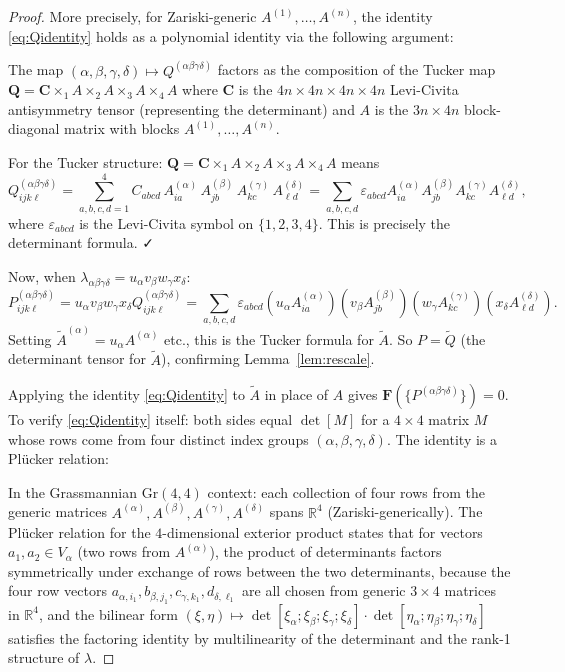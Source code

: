 \documentclass[12pt]{article}
\theoremstyle{definition}
\newcommand{\R}{\mathbb{R}}
\begin{document}
\begin{proof}
More precisely, for Zariski-generic $A^{(1)},\ldots,A^{(n)}$, the identity \eqref{eq:Qidentity} holds as a polynomial identity via the following argument:

The map $(\alpha,\beta,\gamma,\delta) \mapsto Q^{(\alpha\beta\gamma\delta)}$ factors as the composition of the Tucker map $\mathbf{Q} = \mathbf{C} \times_1 A \times_2 A \times_3 A \times_4 A$ where $\mathbf{C}$ is the $4n\times 4n\times 4n\times 4n$ Levi-Civita antisymmetry tensor (representing the determinant) and $A$ is the $3n\times 4n$ block-diagonal matrix with blocks $A^{(1)},\ldots,A^{(n)}$.

For the Tucker structure: $\mathbf{Q} = \mathbf{C} \times_1 A \times_2 A \times_3 A \times_4 A$ means
\[
Q^{(\alpha\beta\gamma\delta)}_{ijk\ell} = \sum_{a,b,c,d=1}^{4}C_{abcd}\,A^{(\alpha)}_{ia}\,A^{(\beta)}_{jb}\,A^{(\gamma)}_{kc}\,A^{(\delta)}_{\ell d}
= \sum_{a,b,c,d}\varepsilon_{abcd}A^{(\alpha)}_{ia}A^{(\beta)}_{jb}A^{(\gamma)}_{kc}A^{(\delta)}_{\ell d},
\]
where $\varepsilon_{abcd}$ is the Levi-Civita symbol on $\{1,2,3,4\}$. This is precisely the determinant formula. ✓

Now, when $\lambda_{\alpha\beta\gamma\delta} = u_\alpha v_\beta w_\gamma x_\delta$:
\[
P^{(\alpha\beta\gamma\delta)}_{ijk\ell} = u_\alpha v_\beta w_\gamma x_\delta Q^{(\alpha\beta\gamma\delta)}_{ijk\ell} = \sum_{a,b,c,d}\varepsilon_{abcd}(u_\alpha A^{(\alpha)}_{ia})(v_\beta A^{(\beta)}_{jb})(w_\gamma A^{(\gamma)}_{kc})(x_\delta A^{(\delta)}_{\ell d}).
\]
Setting $\widetilde{A}^{(\alpha)} = u_\alpha A^{(\alpha)}$ etc., this is the Tucker formula for $\widetilde{A}$. So $P = \widetilde{Q}$ (the determinant tensor for $\widetilde{A}$), confirming Lemma~\ref{lem:rescale}.

Applying the identity \eqref{eq:Qidentity} to $\widetilde{A}$ in place of $A$ gives $\mathbf{F}(\{P^{(\alpha\beta\gamma\delta)}\}) = 0$. To verify \eqref{eq:Qidentity} itself: both sides equal $\det[M]$ for a $4\times 4$ matrix $M$ whose rows come from four distinct index groups $(\alpha,\beta,\gamma,\delta)$. The identity is a Pl\"ucker relation:

In the Grassmannian $\mathrm{Gr}(4,4)$ context: each collection of four rows from the generic matrices $A^{(\alpha)},A^{(\beta)},A^{(\gamma)},A^{(\delta)}$ spans $\R^4$ (Zariski-generically). The Pl\"ucker relation for the $4$-dimensional exterior product states that for vectors $a_1,a_2 \in V_\alpha$ (two rows from $A^{(\alpha)}$), the product of determinants factors symmetrically under exchange of rows between the two determinants, because the four row vectors $a_{\alpha,i_1}, b_{\beta,j_1}, c_{\gamma,k_1}, d_{\delta,\ell_1}$ are all chosen from generic $3\times 4$ matrices in $\R^4$, and the bilinear form $(\xi,\eta) \mapsto \det[\xi_\alpha;\xi_\beta;\xi_\gamma;\xi_\delta]\cdot\det[\eta_\alpha;\eta_\beta;\eta_\gamma;\eta_\delta]$ satisfies the factoring identity by multilinearity of the determinant and the rank-1 structure of $\lambda$.


\end{proof}
\end{document}
